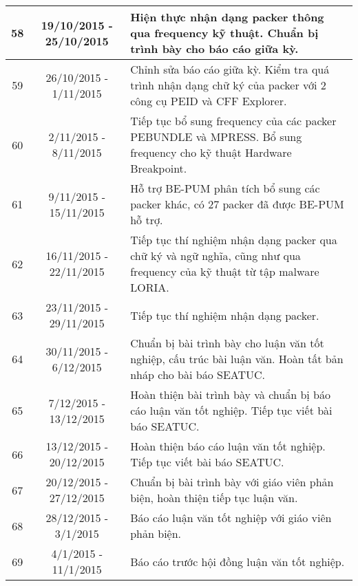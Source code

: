 \begin{center}
\begin{longtable}{|c|c|p{8cm}|}
\hline
58					& 19/10/2015 - 25/10/2015		& Hiện thực nhận dạng packer thông qua frequency kỹ thuật. Chuẩn bị trình bày cho báo cáo giữa kỳ.\\
\hline
59					& 26/10/2015 - 1/11/2015		& Chỉnh sửa báo cáo giữa kỳ. Kiểm tra quá trình nhận dạng chữ ký của packer với 2 công cụ PEID và CFF Explorer.\\
\hline
60					& 2/11/2015 - 8/11/2015			& Tiếp tục bổ sung frequency của các packer PEBUNDLE và MPRESS. Bổ sung frequency cho kỹ thuật Hardware Breakpoint.\\
\hline
61					& 9/11/2015 - 15/11/2015		& Hỗ trợ BE-PUM phân tích bổ sung các packer khác, có 27 packer đã được BE-PUM hỗ trợ.\\
\hline
62					& 16/11/2015 - 22/11/2015		& Tiếp tục thí nghiệm nhận dạng packer qua chữ ký và ngữ nghĩa, cũng như qua frequency của kỹ thuật từ tập malware LORIA.\\
\hline
63					& 23/11/2015 - 29/11/2015		& Tiếp tục thí nghiệm nhận dạng packer.\\
\hline
64					& 30/11/2015 - 6/12/2015		& Chuẩn bị bài trình bày cho luận văn tốt nghiệp, cấu trúc bài luận văn. Hoàn tất bản nháp cho bài báo SEATUC.\\
\hline
65					& 7/12/2015 - 13/12/2015		& Hoàn thiện bài trình bày và chuẩn bị báo cáo luận văn tốt nghiệp. Tiếp tục viết bài báo SEATUC.\\
\hline
66					& 13/12/2015 - 20/12/2015		& Hoàn thiện báo cáo luận văn tốt nghiệp. Tiếp tục viết bài báo SEATUC.\\
\hline
67					& 20/12/2015 - 27/12/2015		& Chuẩn bị bài trình bày với giáo viên phản biện, hoàn thiện tiếp tục luận văn.\\
\hline
68					& 28/12/2015 - 3/1/2015			& Báo cáo luận văn tốt nghiệp với giáo viên phản biện.\\
\hline
69					& 4/1/2015 - 11/1/2015			& Báo cáo trước hội đồng luận văn tốt nghiệp.\\
\hline
\end{longtable}
\end{center}

